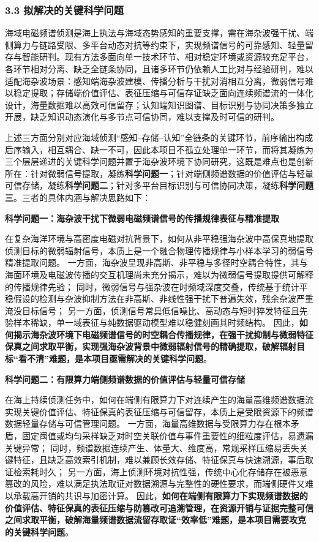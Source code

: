 \subsubsection{3.3 拟解决的关键科学问题}

海域电磁频谱侦测是海上执法与海域态势感知的重要支撑，需在海杂波强干扰、端侧算力与链路受限、多平台动态对抗等约束下，实现频谱信号的可靠感知、轻量留存与智能研判。现有方法多面向单一技术环节、相对稳定环境或资源较充足平台，各环节相对分离、缺乏全链条协同，且诸多环节仍依赖人工比对与经验研判，难以适配海杂波场景：感知端海杂波建模、传播分析与干扰对消相互分离，微弱信号难以稳定提取；存储端价值评估、表征压缩与可信存证缺乏面向连续频谱流的一体化设计，海量数据难以高效可信留存；认知端知识图谱、目标识别与协同决策多独立开展，缺乏知识动态演化与多节点可信协同，难以支撑及时可信的研判。

上述三方面分别对应海域侦测“感知--存储--认知”全链条的关键环节，前序输出构成后序输入，相互耦合、缺一不可，因此本项目不孤立处理单一环节，而将其凝练为三个层层递进的关键科学问题并置于海杂波环境下协同研究，这既是难点也是创新所在：针对微弱信号提取，凝练\textbf{科学问题一}；针对端侧频谱数据的价值评估与轻量可信存储，凝练\textbf{科学问题二}；针对多平台目标识别与可信协同决策，凝练\textbf{科学问题三}。三者的具体内涵与解决思路如下：

\textbf{科学问题一：海杂波干扰下微弱电磁频谱信号的传播规律表征与精准提取}

在复杂海洋环境与高密度电磁对抗背景下，如何从非平稳强海杂波中高保真地提取侦测目标的微弱辐射信号，本质上是一个融合物理传播规律与小样本学习的弱信号精准提取问题。
一方面，海杂波呈现非高斯、非平稳与多径时空耦合特性，其与海面环境及电磁波传播的交互机理尚未充分揭示，难以为微弱信号提取提供可解释的传播规律先验；
同时，微弱信号与强杂波在时频域深度交叠，传统基于统计平稳假设的检测与杂波抑制方法在非高斯、非线性强干扰下普遍失效，残余杂波严重淹没目标信号；
另一方面，侦测信号常具低信噪比、高动态与短时猝发特征且先验样本稀缺，单一域表征与纯数据驱动模型难以稳健刻画其时频结构。
因此，\textbf{如何揭示海杂波环境下电磁频谱信号的时空耦合传播规律，在强干扰抑制与微弱特征保真之间求取平衡，实现强海杂波背景中微弱辐射信号的精确提取，破解辐射目标“看不清”难题，是本项目亟需解决的关键科学问题}。

\textbf{科学问题二：有限算力端侧频谱数据的价值评估与轻量可信存储}

在海上持续侦测任务中，如何在端侧有限算力下对连续产生的海量高维频谱数据流实现关键价值评估、特征保真的表征压缩与可信留存，本质上是受限资源下的频谱数据轻量存储与可信管理问题。
一方面，海量高维数据与受限算力存在根本矛盾，固定阈值或均匀采样缺乏对时空关联价值与事件重要性的细粒度评估，易遗漏关键异常；
同时，频谱数据连续产生、体量大、维度高，常规采样压缩易丢失关键特征，且缺乏高效索引机制，难以兼顾长效存储、特征保真与快速溯源，事后取证检索耗时久；
另一方面，海上侦测环境对抗性强，传统中心化存储存在被恶意篡改的风险，难以满足执法取证对数据溯源与完整性的硬性要求，而端侧硬件又难以承载高开销的共识与加密计算。
因此，\textbf{如何在端侧有限算力下实现频谱数据的价值评估、特征保真的表征压缩与防篡改可追溯管理，在资源开销与证据完整可信之间求取平衡，破解海量频谱数据流留存取证“效率低”难题，是本项目需要攻克的关键科学问题}。

